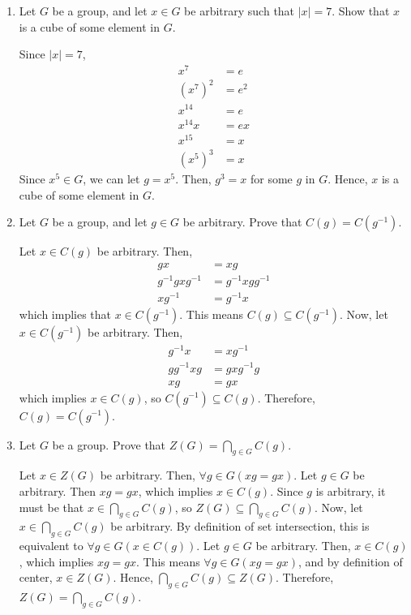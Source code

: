 \begin{enumerate}
        \item Let \(G\) be a group, and let \(x \in G\) be arbitrary such that \(|x| = 7\). Show that \(x\) is a cube of some element in \(G\).

        Since \(|x| = 7\), 
        \begin{align*}
            x^7 &= e \\
            (x^7)^2 &= e^2 \\
            x^{14} &= e \\
            x^{14}x &= ex \\
            x^{15} &= x \\
            (x^5)^3 &= x
        \end{align*}
        Since \(x^5 \in G\), we can let \(g = x^5\). Then, \(g^3 = x\) for some \(g\) in \(G\). Hence, \(x\) is a cube of some element in \(G\).

        \item Let \(G\) be a group, and let \(g\in G\) be arbitrary. Prove that \(C(g) = C(g^{-1})\).

        Let \(x \in C(g)\) be arbitrary. Then,
        \begin{align*}
            gx &= xg \\
            g^{-1}gxg^{-1} &= g^{-1}xgg^{-1} \\
            xg^{-1} &= g^{-1}x
        \end{align*}
        which implies that \(x \in C(g^{-1})\). This means \(C(g) \subseteq C(g^{-1})\). Now, let \(x\in C(g^{-1})\) be arbitrary. Then,
        \begin{align*}
            g^{-1}x &= xg^{-1} \\
            gg^{-1}xg &= gxg^{-1}g \\
            xg &= gx
        \end{align*}
        which implies \(x\in C(g)\), so \(C(g^{-1}) \subseteq C(g)\). Therefore, \(C(g) = C(g^{-1})\).

        \item Let \(G\) be a group. Prove that \(\displaystyle Z(G) =  \bigcap\limits_{g \in G}C(g)\).

        Let \(x \in Z(G)\) be arbitrary. Then, \(\forall g\in G (xg = gx)\). Let \(g\in G\) be arbitrary. Then \(xg = gx\), which implies \(x\in C(g)\). Since \(g\) is arbitrary, it must be that \(x\in\bigcap\limits_{g\in G}C(g)\), so \(Z(G) \subseteq \bigcap\limits_{g\in G}C(g)\). Now, let \(x\in \bigcap\limits_{g\in G}C(g)\) be arbitrary. By definition of set intersection, this is equivalent to \(\forall g\in G (x\in C(g))\). Let \(g\in G\) be arbitrary. Then, \(x\in C(g)\), which implies \(xg = gx\). This means \(\forall g\in G (xg = gx)\), and by definition of center, \(x\in Z(G)\). Hence, \(\bigcap\limits_{g\in G}C(g) \subseteq Z(G)\). Therefore, \(Z(G) = \bigcap\limits_{g\in G}C(g)\).


\end{enumerate}
